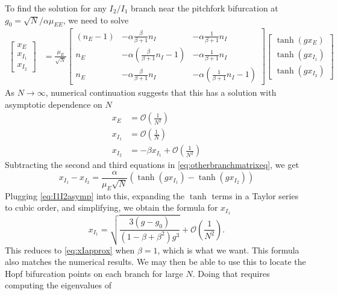 \documentclass[11pt,reqno]{amsart}
\begin{document}
To find the solution for any $I_2/I_1$ branch near the pitchfork bifurcation at $g_0 = \sqrt{N}/\alpha \mu_{EE}$, we need to solve
\begin{equation}\label{eq:otherbranchmatrixeq}
 \begin{aligned}
 \begin{bmatrix} x_E\\x_{I_1}\\x_{I_2}\end{bmatrix} 
 &= \frac{\mu_E}{\sqrt{N}} 
 \begin{bmatrix} (n_E - 1) & -\alpha \frac{\beta}{\beta+1} n_I & - \alpha \frac{1}{\beta+1} n_I  \\
 n_E  & -\alpha \left(\frac{\beta}{\beta+1} n_I-1\right) & - \alpha \frac{1}{\beta+1} n_I  \\
 n_E  & -\alpha \frac{\beta}{\beta+1} n_I & -\alpha \left(\frac{1}{\beta+1} n_I-1\right)
 \end{bmatrix}
 \begin{bmatrix} \tanh(g x_E) \\\tanh ( g x_{I_1} ) \\\tanh(g x_{I_2})\end{bmatrix} 
 \end{aligned}
 \end{equation}
 As $N \rightarrow \infty$, numerical continuation suggests that this has a solution with asymptotic dependence on $N$
\begin{equation}\label{eq:I1I2asymp}
\begin{aligned}
     x_E &= \mathcal{O}\left( \frac{1}{N^2} \right) \\
     x_{I_1} &= \mathcal{O}\left( \frac{1}{N} \right) \\
     x_{I_2} &= -\beta x_{I_1} + \mathcal{O}\left( \frac{1}{N^2} \right) 
 \end{aligned}
 \end{equation}
Subtracting the second and third equations in \cref{eq:otherbranchmatrixeq}, we get
\[
 x_{I_1} - x_{I_2} = \frac{\alpha}{\mu_{E}\sqrt{N}}\left( \tanh(g x_{I_1}) - \tanh(g x_{I_2}) \right)
 \]
Plugging \cref{eq:I1I2asymp} into this, expanding the $\tanh$ terms in a Taylor series to cubic order, and simplifying, we obtain the formula for $x_{I_1}$
 \begin{equation}\label{eq:XI1}
 x_{I_1} = \sqrt{ \frac{ 3(g - g_0) }{ (1 - \beta + \beta^2 )g^3}} + \mathcal{O}\left( \frac{1}{N^2} \right).
 \end{equation}
This reduces to \cref{eq:xIapprox} when $\beta = 1$, which is what we want. This formula also matches the numerical results.  We may then be able to use this to locate the Hopf bifurcation points on each branch for large $N$. Doing that requires computing the eigenvalues of
\end{document}
